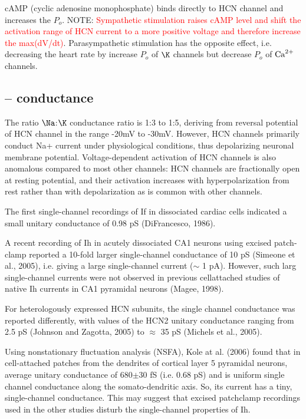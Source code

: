 cAMP (cyclic adenosine monophosphate) binds directly to HCN channel and
increases the $P_o$. NOTE:
\textcolor{red}{Sympathetic stimulation raises cAMP level and shift the
activation range of HCN current to a more positive voltage and therefore
increase the max(dV/dt)}. Parasympathetic stimulation has the opposite effect, i.e.
decreasing the heart rate by increase $P_o$ of $\K$ channels but decrease $P_o$
of ${\text{Ca}^{2+}}$ channels.

\subsection{-- conductance}

The ratio $\Na$:$\K$ conductance ratio is 1:3 to 1:5, deriving from reversal
potential of HCN channel in the range -20mV to -30mV.
However, HCN channels primarily conduct Na+ current under physiological conditions, thus depolarizing neuronal
membrane potential.
Voltage-dependent activation of HCN channels is also anomalous compared to most
other channels: HCN channels are fractionally open at resting potential, and
their activation increases with hyperpolarization from rest rather than with
depolarization as is common with other channels.


The first single-channel recordings of If in dissociated cardiac cells indicated
a small unitary conductance of 0.98 pS (DiFrancesco, 1986).

A recent recording of Ih in acutely dissociated CA1 neurons using excised
patch-clamp reported a 10-fold larger single-channel conductance of 10 pS
(Simeone et al., 2005), i.e. giving a large single-channel current ($\sim$ 1
pA).
However, such larg single-channel currents were not observed in previous
cellattached studies of native Ih currents in CA1 pyramidal neurons (Magee,
1998).

For heterologously expressed HCN subunits, the single channel conductance
was reported differently, with values of the HCN2 unitary conductance ranging
from 2.5 pS (Johnson and Zagotta, 2005) to $\approx$ 35 pS (Michels et al.,
2005).

Using nonstationary fluctuation analysis (NSFA), Kole at al. (2006) found that
in cell-attached patches from the dendrites of cortical layer 5 pyramidal
neurons, average unitary conductance of 680$\pm$30 fS (i.e. 0.68 pS) and is
uniform single channel conductance along the somato-dendritic axis. So, its
current has a tiny, single-channel conductance.
This may suggest that excised patchclamp recordings used in the other
studies disturb the single-channel properties of Ih.

